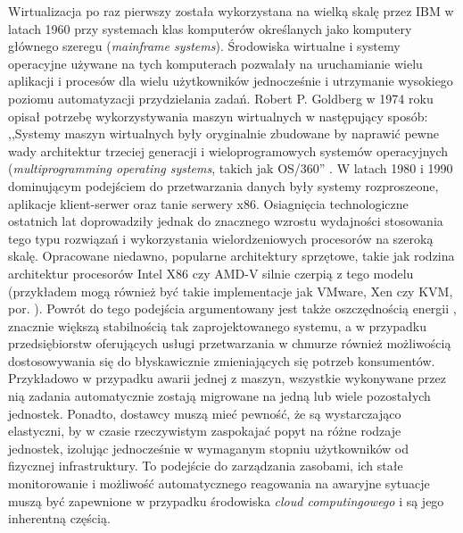 \documentclass[12pt,a4paper,twoside]{article}
\begin{document}
Wirtualizacja po raz pierwszy została wykorzystana na wielką skalę przez IBM w latach 1960 przy systemach klas komputerów określanych jako komputery głównego szeregu (\textit{mainframe systems}). Środowiska wirtualne i systemy operacyjne używane na tych komputerach pozwalały na uruchamianie wielu aplikacji i procesów dla wielu użytkowników jednocześnie i utrzymanie wysokiego poziomu automatyzacji przydzielania zadań. Robert P. Goldberg w 1974 roku opisał potrzebę wykorzystywania maszyn wirtualnych w następujący sposób: ,,Systemy maszyn wirtualnych były oryginalnie zbudowane by naprawić pewne wady architektur trzeciej generacji i wieloprogramowych systemów operacyjnych (\textit{multiprogramming operating systems}, takich jak OS/360'' \citep{goldberg1974}. W latach 1980 i 1990 dominującym podejściem do przetwarzania danych były systemy rozproszeone, aplikacje klient-serwer oraz tanie serwery x86. Osiagnięcia technologiczne ostatnich lat doprowadziły jednak do znacznego wzrostu wydajności stosowania tego typu rozwiązań i wykorzystania wielordzeniowych procesorów na szeroką skalę. Opracowane niedawno, popularne architektury sprzętowe, takie jak rodzina architektur procesorów Intel X86 czy AMD-V silnie czerpią z tego modelu (przykładem mogą również być takie implementacje jak VMware, Xen czy KVM, por. \citet{shroff2010}). Powrót do tego podejścia argumentowany jest także oszczędnością energii \citep{ward2013}, znacznie większą stabilnością tak zaprojektowanego systemu, a w przypadku przedsiębiorstw oferujących usługi przetwarzania w chmurze również możliwością dostosowywania się do błyskawicznie zmieniających się potrzeb konsumentów. Przykładowo w przypadku awarii jednej z maszyn, wszystkie wykonywane przez nią zadania automatycznie zostają migrowane na jedną lub wiele pozostałych jednostek. Ponadto, dostawcy muszą mieć pewność, że są wystarczająco elastyczni, by w czasie rzeczywistym zaspokajać popyt na różne rodzaje jednostek, izolując jednocześnie w wymaganym stopniu użytkowników od fizycznej infrastruktury. To podejście do zarządzania zasobami, ich stałe monitorowanie i możliwość automatycznego reagowania na awaryjne sytuacje muszą być zapewnione w przypadku środowiska \textit{cloud computingowego} i są jego inherentną częścią.
\end{document}
